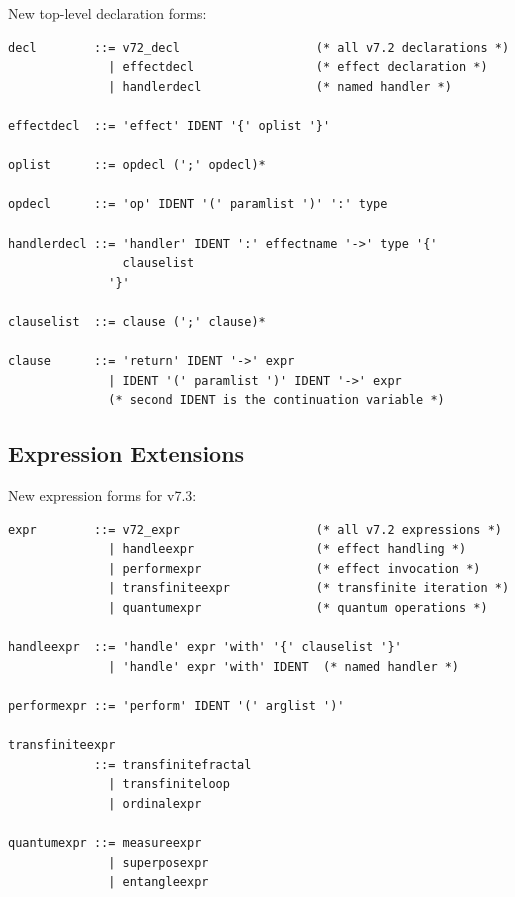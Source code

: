 \begin{definition}
\label{def:toplevel-grammar}
New top-level declaration forms:
\begin{lstlisting}[style=bnf,caption={v7.3 Top-Level Declarations}]
decl        ::= v72_decl                   (* all v7.2 declarations *)
              | effectdecl                 (* effect declaration *)
              | handlerdecl                (* named handler *)

effectdecl  ::= 'effect' IDENT '{' oplist '}'

oplist      ::= opdecl (';' opdecl)*

opdecl      ::= 'op' IDENT '(' paramlist ')' ':' type

handlerdecl ::= 'handler' IDENT ':' effectname '->' type '{'
                clauselist
              '}'

clauselist  ::= clause (';' clause)*

clause      ::= 'return' IDENT '->' expr
              | IDENT '(' paramlist ')' IDENT '->' expr
              (* second IDENT is the continuation variable *)
\end{lstlisting}
\end{definition}

\subsection{Expression Extensions}
\label{subsec:expr-grammar}

\begin{definition}
\label{def:expr-grammar}
New expression forms for v7.3:
\begin{lstlisting}[style=bnf,caption={v7.3 Expression Extensions}]
expr        ::= v72_expr                   (* all v7.2 expressions *)
              | handleexpr                 (* effect handling *)
              | performexpr                (* effect invocation *)
              | transfiniteexpr            (* transfinite iteration *)
              | quantumexpr                (* quantum operations *)

handleexpr  ::= 'handle' expr 'with' '{' clauselist '}'
              | 'handle' expr 'with' IDENT  (* named handler *)

performexpr ::= 'perform' IDENT '(' arglist ')'

transfiniteexpr
            ::= transfinitefractal
              | transfiniteloop
              | ordinalexpr

quantumexpr ::= measureexpr
              | superposexpr
              | entangleexpr
\end{lstlisting}
\end{definition}

